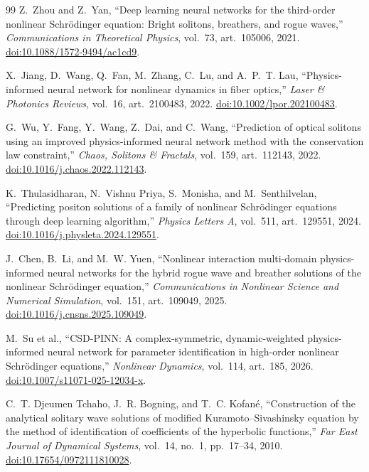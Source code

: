 \documentclass[11pt]{article}
\begin{document}
\begin{thebibliography}{99}
Z.~Zhou and Z.~Yan,
``Deep learning neural networks for the third-order nonlinear Schr\"odinger
equation: Bright solitons, breathers, and rogue waves,''
\emph{Communications in Theoretical Physics}, vol.~73, art.~105006, 2021.
\href{https://doi.org/10.1088/1572-9494/ac1cd9}{doi:10.1088/1572-9494/ac1cd9}.

X.~Jiang, D.~Wang, Q.~Fan, M.~Zhang, C.~Lu, and A.~P.~T. Lau,
``Physics-informed neural network for nonlinear dynamics in fiber optics,''
\emph{Laser \& Photonics Reviews}, vol.~16, art.~2100483, 2022.
\href{https://doi.org/10.1002/lpor.202100483}{doi:10.1002/lpor.202100483}.

G.~Wu, Y.~Fang, Y.~Wang, Z.~Dai, and C.~Wang,
``Prediction of optical solitons using an improved physics-informed neural
network method with the conservation law constraint,''
\emph{Chaos, Solitons \& Fractals}, vol.~159, art.~112143, 2022.
\href{https://doi.org/10.1016/j.chaos.2022.112143}{doi:10.1016/j.chaos.2022.112143}.

K.~Thulasidharan, N.~Vishnu Priya, S.~Monisha, and M.~Senthilvelan,
``Predicting positon solutions of a family of nonlinear Schr\"odinger equations
through deep learning algorithm,'' \emph{Physics Letters A}, vol.~511,
art.~129551, 2024.
\href{https://doi.org/10.1016/j.physleta.2024.129551}{doi:10.1016/j.physleta.2024.129551}.

J.~Chen, B.~Li, and M.~W. Yuen,
``Nonlinear interaction multi-domain physics-informed neural networks for the
hybrid rogue wave and breather solutions of the nonlinear Schr\"odinger
equation,'' \emph{Communications in Nonlinear Science and Numerical
Simulation}, vol.~151, art.~109049, 2025.
\href{https://doi.org/10.1016/j.cnsns.2025.109049}{doi:10.1016/j.cnsns.2025.109049}.

M.~Su et al.,
``CSD-PINN: A complex-symmetric, dynamic-weighted physics-informed neural
network for parameter identification in high-order nonlinear Schr\"odinger
equations,'' \emph{Nonlinear Dynamics}, vol.~114, art.~185, 2026.
\href{https://doi.org/10.1007/s11071-025-12034-x}{doi:10.1007/s11071-025-12034-x}.

C.~T. Djeumen Tchaho, J.~R. Bogning, and T.~C. Kofan\'e,
``Construction of the analytical solitary wave solutions of modified
Kuramoto--Sivashinsky equation by the method of identification of coefficients
of the hyperbolic functions,'' \emph{Far East Journal of Dynamical Systems},
vol.~14, no.~1, pp.~17--34, 2010.
\href{https://doi.org/10.17654/0972111810028}{doi:10.17654/0972111810028}.


\end{thebibliography}
\end{document}
